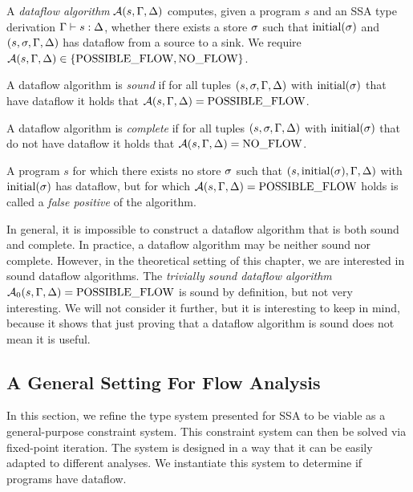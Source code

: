 \begin{definition}
    A \emph{dataflow algorithm} $\operatorname{\mathcal{A}}(s, \Gamma, \Delta)$ computes, given a program $s$
    and an SSA type derivation $\Gamma \vdash {s}: \Delta$,
    whether there exists a store $\sigma{}$ 
    such that $\text{initial}({\sigma})$ and $(s, \sigma, \Gamma, \Delta)$ has dataflow from a source to a sink.
    We require $\operatorname{\mathcal{A}}(s, \Gamma, \Delta) \in \{\text{POSSIBLE\_FLOW}, \text{NO\_FLOW}\}$.
\end{definition}

\begin{definition}[Soundness]
    A dataflow algorithm is \emph{sound} if for all tuples $(s, \sigma, \Gamma, \Delta)$ with $\text{initial}({\sigma})$ that
    have dataflow it holds that $\operatorname{\mathcal{A}}(s, \Gamma, \Delta) = \text{POSSIBLE\_FLOW}$.
\end{definition}

\begin{definition}[Completeness]
    A dataflow algorithm is \emph{complete} if for all tuples $(s, \sigma, \Gamma, \Delta)$ with $\text{initial}({\sigma})$ that
    do not have dataflow it holds that $\operatorname{\mathcal{A}}(s, \Gamma, \Delta) = \text{NO\_FLOW}$.
\end{definition}

\begin{definition}
    A program $s$ for which there exists no store $\sigma$ such that 
    $(s, \text{initial}({\sigma}), \Gamma, \Delta)$ with $\text{initial}({\sigma}){}$ has dataflow,
     but for which $\operatorname{\mathcal{A}}(s, \Gamma, \Delta) = \text{POSSIBLE\_FLOW}$ holds
    is called a \emph{false positive} of the algorithm.
\end{definition}
\begin{remark}
    In general, it is impossible to construct a dataflow algorithm that is both 
    sound and complete.
    In practice, a dataflow algorithm may be neither sound nor complete.
    However, in the theoretical setting of this chapter, we are interested in 
    sound dataflow algorithms.
    The \emph{trivially sound dataflow algorithm} $\operatorname{\mathcal{A}}_0(s, \Gamma, \Delta) = \text{POSSIBLE\_FLOW}$ 
    is sound by definition, but not very interesting.
    We will not consider it further, but it is interesting to keep in mind,
    because it shows that just proving that a dataflow algorithm is sound does not
    mean it is useful.    
\end{remark}

\subsection{A General Setting For Flow Analysis}
\label{sec:df-theory}
In this section, we refine the type system presented for SSA to be viable as a
general-purpose constraint system.
This constraint system can then be solved via fixed-point iteration.
The system is designed in a way that it can be easily adapted to different analyses.
We instantiate this system to determine if programs have dataflow.

